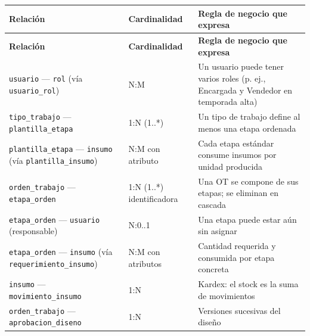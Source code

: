 \documentclass[11pt,a4paper]{article}
\begin{document}
\begingroup
\begin{longtable}{@{}>{\raggedright\arraybackslash\hspace{0pt}}p{}>{\raggedright\arraybackslash\hspace{0pt}}p{}>{\raggedright\arraybackslash\hspace{0pt}}p{}@{}}
\toprule
\textbf{Relación} & \textbf{Cardinalidad} & \textbf{Regla de negocio que expresa} \\ \midrule
\endfirsthead
\toprule
\textbf{Relación} & \textbf{Cardinalidad} & \textbf{Regla de negocio que expresa} \\ \midrule
\endhead
\bottomrule
\endlastfoot
\texttt{usuario} --- \texttt{rol} (vía \texttt{usuario\_\allowbreak{}rol}) & N:M & Un usuario puede tener varios roles (p. ej., Encargada y Vendedor en temporada alta) \\ \addlinespace[0.25em]
\texttt{tipo\_\allowbreak{}trabajo} --- \texttt{plantilla\_\allowbreak{}etapa} & 1:N (1..*) & Un tipo de trabajo define al menos una etapa ordenada \\ \addlinespace[0.25em]
\texttt{plantilla\_\allowbreak{}etapa} --- \texttt{insumo} (vía \texttt{plantilla\_\allowbreak{}insumo}) & N:M con atributo & Cada etapa estándar consume insumos por unidad producida \\ \addlinespace[0.25em]
\texttt{orden\_\allowbreak{}trabajo} --- \texttt{etapa\_\allowbreak{}orden} & 1:N (1..*) identificadora & Una OT se compone de sus etapas; se eliminan en cascada \\ \addlinespace[0.25em]
\texttt{etapa\_\allowbreak{}orden} --- \texttt{usuario} (responsable) & N:0..1 & Una etapa puede estar aún sin asignar \\ \addlinespace[0.25em]
\texttt{etapa\_\allowbreak{}orden} --- \texttt{insumo} (vía \texttt{requerimiento\_\allowbreak{}insumo}) & N:M con atributos & Cantidad requerida y consumida por etapa concreta \\ \addlinespace[0.25em]
\texttt{insumo} --- \texttt{movimiento\_\allowbreak{}insumo} & 1:N & Kardex: el stock es la suma de movimientos \\ \addlinespace[0.25em]
\texttt{orden\_\allowbreak{}trabajo} --- \texttt{aprobacion\_\allowbreak{}diseno} & 1:N & Versiones sucesivas del diseño \\
\end{longtable}
\endgroup
\end{document}
